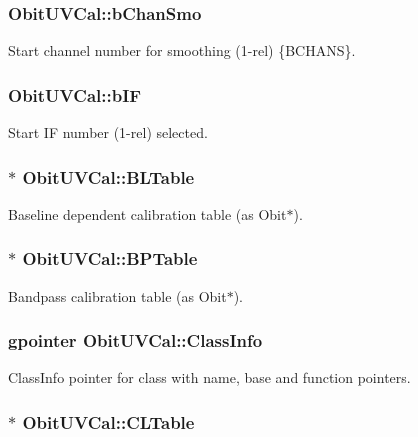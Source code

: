 \subsubsection{ {\bf Obit\-UVCal::b\-Chan\-Smo}}\label{structObitUVCal_o29}


Start channel number for smoothing (1-rel) \{BCHANS\}. 

\subsubsection{ {\bf Obit\-UVCal::b\-IF}}\label{structObitUVCal_o23}


Start IF number (1-rel) selected. 

\subsubsection{$\ast$ {\bf Obit\-UVCal::BLTable}}\label{structObitUVCal_o44}


Baseline dependent calibration table (as Obit$\ast$). 

\subsubsection{$\ast$ {\bf Obit\-UVCal::BPTable}}\label{structObitUVCal_o45}


Bandpass calibration table (as Obit$\ast$). 

\subsubsection{\setlength{\rightskip}{0pt plus 5cm}gpointer {\bf Obit\-UVCal::Class\-Info}}\label{structObitUVCal_o1}


Class\-Info pointer for class with name, base and function pointers. 

\subsubsection{$\ast$ {\bf Obit\-UVCal::CLTable}}\label{structObitUVCal_o47}


